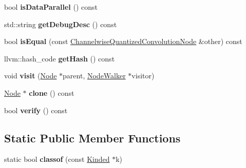 \begin{DoxyCompactItemize}
bool {\bfseries is\+Data\+Parallel} () const
\item 
\mbox{\label{classglow_1_1_channelwise_quantized_convolution_node_ab2ae50130cbe79034515a94e72c6d3c4}} 
std\+::string {\bfseries get\+Debug\+Desc} () const
\item 
\mbox{\label{classglow_1_1_channelwise_quantized_convolution_node_a55d4f7a97687ce3ccc3bbaadf4d74115}} 
bool {\bfseries is\+Equal} (const \hyperlink{classglow_1_1_channelwise_quantized_convolution_node}{Channelwise\+Quantized\+Convolution\+Node} \&other) const
\item 
\mbox{\label{classglow_1_1_channelwise_quantized_convolution_node_a574a874607596ee77c59ad529e7106f0}} 
llvm\+::hash\+\_\+code {\bfseries get\+Hash} () const
\item 
\mbox{\label{classglow_1_1_channelwise_quantized_convolution_node_abcc0376be527a5d8e1ea469ece990638}} 
void {\bfseries visit} (\hyperlink{classglow_1_1_node}{Node} $\ast$parent, \hyperlink{classglow_1_1_node_walker}{Node\+Walker} $\ast$visitor)
\item 
\mbox{\label{classglow_1_1_channelwise_quantized_convolution_node_a6b9e3547d4f1127e02ce0a3ff1c6a91e}} 
\hyperlink{classglow_1_1_node}{Node} $\ast$ {\bfseries clone} () const
\item 
\mbox{\label{classglow_1_1_channelwise_quantized_convolution_node_ac9b943565f300f72ccc5c858395828b4}} 
bool {\bfseries verify} () const
\end{DoxyCompactItemize}
\subsection*{Static Public Member Functions}
\begin{DoxyCompactItemize}
\item 
\mbox{\label{classglow_1_1_channelwise_quantized_convolution_node_a4976f5937ea2ac83173594e4111ef000}} 
static bool {\bfseries classof} (const \hyperlink{classglow_1_1_kinded}{Kinded} $\ast$k)
\end{DoxyCompactItemize}
